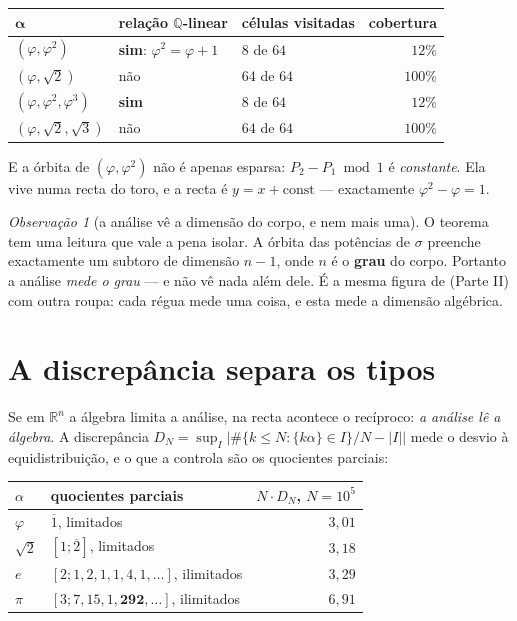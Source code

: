 \documentclass[11pt,a4paper]{article}
\theoremstyle{plain}
\theoremstyle{definition}
\theoremstyle{remark}
\newtheorem{obs}[teorema]{Observação}
\newcommand{\R}{\mathbb{R}}
\newcommand{\Q}{\mathbb{Q}}
\begin{document}
\begin{center}\small
\begin{tabular}{lllr}
\hline
$\boldsymbol\alpha$ & relação $\Q$-linear & células visitadas & cobertura \\ \hline
$(\varphi,\varphi^2)$ & \textbf{sim}: $\varphi^2=\varphi+1$ & $8$ de $64$ & $12\%$ \\
$(\varphi,\sqrt2)$ & não & $64$ de $64$ & $100\%$ \\
$(\varphi,\varphi^2,\varphi^3)$ & \textbf{sim} & $8$ de $64$ & $12\%$ \\
$(\varphi,\sqrt2,\sqrt3)$ & não & $64$ de $64$ & $100\%$ \\
\hline
\end{tabular}
\end{center}

\noindent E a órbita de $(\varphi,\varphi^2)$ não é apenas esparsa: $P_2-P_1 \bmod 1$ é
\emph{constante}. Ela vive numa recta do toro, e a recta é $y = x + \text{const}$ --- exactamente
$\varphi^2-\varphi=1$.

\begin{obs}[a análise vê a dimensão do corpo, e nem mais uma]\label{obs:vedimensao}
O teorema tem uma leitura que vale a pena isolar. A órbita das potências de $\sigma$ preenche
exactamente um subtoro de dimensão $n-1$, onde $n$ é o \textbf{grau} do corpo. Portanto a análise
\emph{mede o grau} --- e não vê nada além dele. É a mesma figura de (Parte II) com outra roupa: cada régua
mede uma coisa, e esta mede a dimensão algébrica.
\end{obs}

\section{A discrepância separa os tipos}\label{sec:discrep}

Se em $\R^n$ a álgebra limita a análise, na recta acontece o recíproco: \emph{a análise lê a
álgebra}. A discrepância $D_N = \sup_I \big| \#\{k\leq N: \{k\alpha\}\in I\}/N - |I| \big|$ mede o
desvio à equidistribuição, e o que a controla são os quocientes parciais:

\begin{center}\small
\begin{tabular}{llr}
\hline
$\alpha$ & quocientes parciais & $N\cdot D_N$, $N=10^5$ \\ \hline
$\varphi$ & $\overline1$, limitados & $3{,}01$ \\
$\sqrt2$ & $[1;\overline2]$, limitados & $3{,}18$ \\
$e$ & $[2;1,2,1,1,4,1,\dots]$, ilimitados & $3{,}29$ \\
$\pi$ & $[3;7,15,1,\mathbf{292},\dots]$, ilimitados & $6{,}91$ \\
\hline
\end{tabular}
\end{center}
\end{document}
